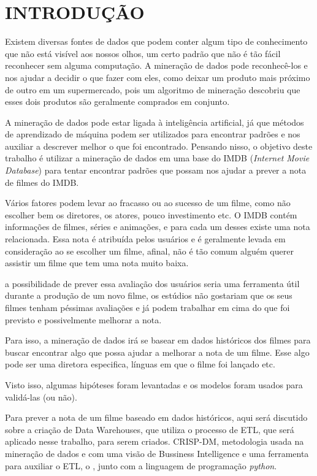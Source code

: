 \section{INTRODUÇÃO}

Existem diversas fontes de dados que podem conter algum tipo de conhecimento que não está visível aos nossos olhos, um certo padrão que não é tão fácil reconhecer sem alguma computação. A mineração de dados pode reconhecê-los e nos ajudar a decidir o que fazer com eles, como deixar um produto mais próximo de outro em um supermercado, pois um algoritmo de mineração descobriu que esses dois produtos são geralmente comprados em conjunto.

A mineração de dados pode estar ligada à inteligência artificial, já que métodos de aprendizado de máquina podem ser utilizados para encontrar padrões e nos auxiliar a descrever melhor o que foi encontrado.
Pensando nisso, o objetivo deste trabalho é utilizar a mineração de dados em uma base do IMDB (\textit{Internet Movie Database}) para tentar encontrar padrões que possam nos ajudar a prever a nota de filmes do IMDB.

Vários fatores podem levar ao fracasso ou ao sucesso de um filme, como não escolher bem os diretores, os atores, pouco investimento etc. O IMDB contém informações de filmes, séries e animações, e para cada um desses existe uma nota relacionada. Essa nota é atribuída pelos usuários e é geralmente levada em consideração ao se escolher um filme, afinal, não é tão comum alguém querer assistir um filme que tem uma nota muito baixa.

a possibilidade de prever essa avaliação dos usuários seria uma ferramenta útil durante a produção de um novo filme, os estúdios não gostariam que os seus filmes tenham péssimas avaliações e já podem trabalhar em cima do que foi previsto e possivelmente melhorar a nota.

Para isso, a mineração de dados irá se basear em dados históricos dos filmes para buscar encontrar algo que possa ajudar a melhorar a nota de um filme. Esse algo pode ser uma diretora especifica, línguas em que o filme foi lançado etc.

Visto isso, algumas hipóteses foram levantadas e os modelos foram usados para validá-las (ou não).

Para prever a nota de um filme baseado em dados históricos, aqui será discutido sobre a criação de Data Warehouses, que utiliza o processo de ETL, que será aplicado nesse trabalho, para serem criados. CRISP-DM, metodologia usada na mineração de dados e com uma visão de Bussiness Intelligence e uma ferramenta para auxiliar o ETL, o \pdi, junto com a linguagem de programação \textit{python}.

